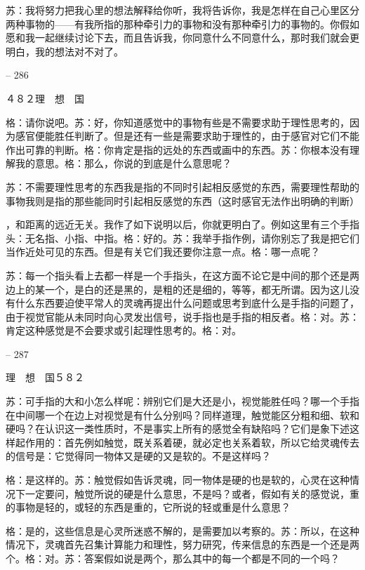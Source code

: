 \documentclass[11pt,oneside]{book}
\begin{document}
\begin{common-format}
    苏：我将努力把我心里的想法解释给你听，我将告诉你，我是怎样在自己心里区分两种事物的——有我所指的那种牵引力的事物和没有那种牵引力的事物的。你假如愿和我一起继续讨论下去，而且告诉我，你同意什么不同意什么，那时我们就会更明白，我的想法对不对了。

    

-- 286

    ４８２理　想　国

    格：请你说吧。苏：好，你知道感觉中的事物有些是不需要求助于理性思考的，因为感官便能胜任判断了。但是还有一些是需要求助于理性的，由于感官对它们不能作出可靠的判断。格：你肯定是指的远处的东西或画中的东西。苏：你根本没有理解我的意思。格：那么，你说的到底是什么意思呢？

    苏：不需要理性思考的东西我是指的不同时引起相反感觉的东西，需要理性帮助的事物我则是指的那些能同时引起相反感觉的东西（这时感官无法作出明确的判断）

    ，和距离的远近无关。我作了如下说明以后，你就更明白了。例如这里有三个手指头：无名指、小指、中指。格：好的。苏：我举手指作例，请你别忘了我是把它们当作近处可见的东西。但是有关它们我还要你注意一点。格：哪一点呢？

    苏：每一个指头看上去都一样是一个手指头，在这方面不论它是中间的那个还是两边上的某一个，是白的还是黑的，是粗的还是细的，等等，都无所谓。因为这儿没有什么东西要迫使平常人的灵魂再提出什么问题或思考到底什么是手指的问题了，由于视觉官能从未同时向心灵发出信号，说手指也是手指的相反者。格：对。苏：肯定这种感觉是不会要求或引起理性思考的。格：对。

    

-- 287

    理　想　国５８２

    苏：可手指的大和小怎么样呢：辨别它们是大还是小，视觉能胜任吗？哪一个手指在中间哪一个在边上对视觉是有什么分别吗？同样道理，触觉能区分粗和细、软和硬吗？在认识这一类性质时，不是事实上所有的感觉全有缺陷吗？它们是象下述这样起作用的：首先例如触觉，既关系着硬，就必定也关系着软，所以它给灵魂传去的信号是：它觉得同一物体又是硬的又是软的。不是这样吗？

    格：是这样的。苏：触觉假如告诉灵魂，同一物体是硬的也是软的，心灵在这种情况下一定要问，触觉所说的硬是什么意思，不是吗？或者，假如有关的感觉说，重的事物是轻的，或轻的东西是重的，它所说的轻或重是什么意思？

    格：是的，这些信息是心灵所迷惑不解的，是需要加以考察的。苏：所以，在这种情况下，灵魂首先召集计算能力和理性，努力研究，传来信息的东西是一个还是两个。格：对。苏：答案假如说是两个，那么其中的每一个都是不同的一个吗？


\end{common-format}
\end{document}
